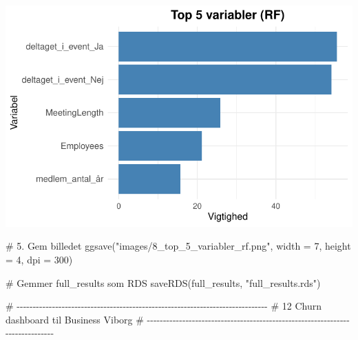 \documentclass[
  11pt,
  letterpaper,
  DIV=11,
  numbers=noendperiod]{scrartcl}
\newenvironment{Shaded}{\begin{snugshade}}{\end{snugshade}}
\newcommand{\AttributeTok}[1]{\textcolor[rgb]{0.40,0.45,0.13}{#1}}
\newcommand{\CommentTok}[1]{\textcolor[rgb]{0.37,0.37,0.37}{#1}}
\newcommand{\DecValTok}[1]{\textcolor[rgb]{0.68,0.00,0.00}{#1}}
\newcommand{\FunctionTok}[1]{\textcolor[rgb]{0.28,0.35,0.67}{#1}}
\newcommand{\NormalTok}[1]{\textcolor[rgb]{0.00,0.23,0.31}{#1}}
\newcommand{\StringTok}[1]{\textcolor[rgb]{0.13,0.47,0.30}{#1}}
\begin{document}
\includegraphics{Quarto_files/figure-pdf/unnamed-chunk-16-5.pdf}

\begin{Shaded}
\begin{Highlighting}[]
\CommentTok{\# 5. Gem billedet}
\FunctionTok{ggsave}\NormalTok{(}\StringTok{"images/8\_top\_5\_variabler\_rf.png"}\NormalTok{, }\AttributeTok{width =} \DecValTok{7}\NormalTok{, }\AttributeTok{height =} \DecValTok{4}\NormalTok{, }\AttributeTok{dpi =} \DecValTok{300}\NormalTok{)}

\CommentTok{\# Gemmer full\_results som RDS}
\FunctionTok{saveRDS}\NormalTok{(full\_results, }\StringTok{"full\_results.rds"}\NormalTok{)}
\end{Highlighting}
\end{Shaded}

\begin{Shaded}
\begin{Highlighting}[]
\CommentTok{\# {-}{-}{-}{-}{-}{-}{-}{-}{-}{-}{-}{-}{-}{-}{-}{-}{-}{-}{-}{-}{-}{-}{-}{-}{-}{-}{-}{-}{-}{-}{-}{-}{-}{-}{-}{-}{-}{-}{-}{-}{-}{-}{-}{-}{-}{-}{-}{-}{-}{-}{-}{-}{-}{-}{-}{-}{-}{-}{-}{-}{-}{-}{-}{-}{-}{-}{-}{-}{-}{-}{-}{-}{-}{-}{-}{-}{-}{-}}
\CommentTok{\# 12 Churn dashboard til Business Viborg}
\CommentTok{\# {-}{-}{-}{-}{-}{-}{-}{-}{-}{-}{-}{-}{-}{-}{-}{-}{-}{-}{-}{-}{-}{-}{-}{-}{-}{-}{-}{-}{-}{-}{-}{-}{-}{-}{-}{-}{-}{-}{-}{-}{-}{-}{-}{-}{-}{-}{-}{-}{-}{-}{-}{-}{-}{-}{-}{-}{-}{-}{-}{-}{-}{-}{-}{-}{-}{-}{-}{-}{-}{-}{-}{-}{-}{-}{-}{-}{-}{-}}
\end{Highlighting}
\end{Shaded}
\end{document}
